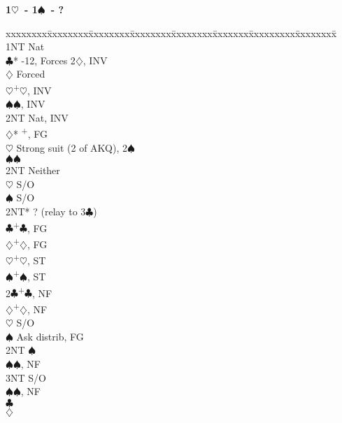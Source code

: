 \documentclass[10pt]{article}
\renewcommand{\c}{$\clubsuit$}
\renewcommand{\d}{$\diamondsuit$}
\newcommand{\h}{$\heartsuit$}
\newcommand{\s}{$\spadesuit$}
\newcommand{\p}{\textsuperscript{+}}
\newcommand{\m}{\textsuperscript{\textminus}}
\newenvironment{bidtable}[1][]
{\textbf{#1}
  \begin{adjustwidth}{1em}{}
    \addvspace{2pt}
    \begin{tabbing}
      xxxxxxxx\=xxxxxxxx\=xxxxxxxx\=xxxxxxxx\=xxxxxxxx\=xxxxxxx\=xxxxxxxxx\=xxxxxxxx\=\kill}
{\end{tabbing}\end{adjustwidth}\bigskip}%
\begin{document}
\begin{bidtable}[1\h\ - 1\s\ - ?]
1NT \> Nat                                          \\
    \c* {}-12, Forces 2\d, INV               \\
    \>      \d \> Forced                        \\
    \>      \>     \h {}\p\h, INV             \\
    \>      \>     \s {}\s, INV               \\
    \>      \>     \> 2NT \> Nat, INV               \\
    \d* {}\p, FG                             \\
    \>      \h \> Strong suit (2 of AKQ), 2\m\s \\
    \>      \s {}\s                           \\
    \>      \> 2NT \> Neither                       \\
    \h  \> S/O                                  \\
    \s  \> S/O                                  \\
    \> 2NT* \> ? (relay to 3\c)                     \\
    \c  {}\p\c, FG                            \\
    \d  {}\p\d, FG                            \\
    \h  {}\p\h, ST                            \\
    \s  {}\p\s, ST                            \\
2\c {}\p\c, NF                                    \\
    \d  {}\p\d, NF                            \\
    \h  \> S/O                                  \\
    \s  \> Ask distrib, FG                      \\
    \>      \> 2NT \s                           \\
    \>      \>     \s {}\s, NF                \\
    \>      \>     \> 3NT \> S/O                    \\
    \>      \>     \s {}\s, NF                \\
    \>      \c {}                          \\
    \>      \d {}                          \\

\end{bidtable}
\end{document}
